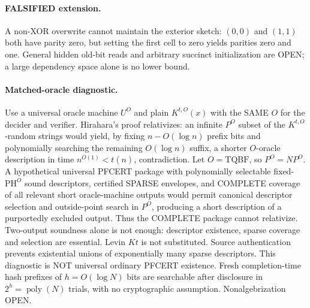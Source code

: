 \documentclass[11pt]{article}
\begin{document}
\paragraph{FALSIFIED extension.} A non-XOR overwrite cannot maintain the exterior sketch: $(0,0)$ and $(1,1)$ both have parity zero, but setting the first cell to zero yields parities zero and one. General hidden old-bit reads and arbitrary succinct initialization are OPEN; a large dependency space alone is no lower bound.
\paragraph{Matched-oracle diagnostic.}
Use a universal oracle machine $U^O$ and plain $K^{t,O}(x)$ with the SAME $O$ for the decider and verifier. Hirahara's proof relativizes: an infinite $P^O$ subset of the $K^{t,O}$-random strings would yield, by fixing $n-O(\log n)$ prefix bits and polynomially searching the remaining $O(\log n)$ suffix, a shorter $O$-oracle description in time $n^{O(1)}<t(n)$, contradiction. Let $O=\mathrm{TQBF}$, so $P^O=NP^O$. A hypothetical universal PFCERT package with polynomially selectable fixed-$\mathrm{PH}^O$ sound descriptors, certified SPARSE envelopes, and COMPLETE coverage of all relevant short oracle-machine outputs would permit canonical descriptor selection and outside-point search in $P^O$, producing a short description of a purportedly excluded output. Thus the COMPLETE package cannot relativize. Two-output soundness alone is not enough: descriptor existence, sparse coverage and selection are essential. Levin $Kt$ is not substituted. Source authentication prevents existential unions of exponentially many sparse descriptors. This diagnostic is NOT universal ordinary PFCERT existence. Fresh completion-time hash prefixes of $h=O(\log N)$ bits are searchable after disclosure in $2^h=\operatorname{poly}(N)$ trials, with no cryptographic assumption. Nonalgebrization OPEN.
\end{document}
